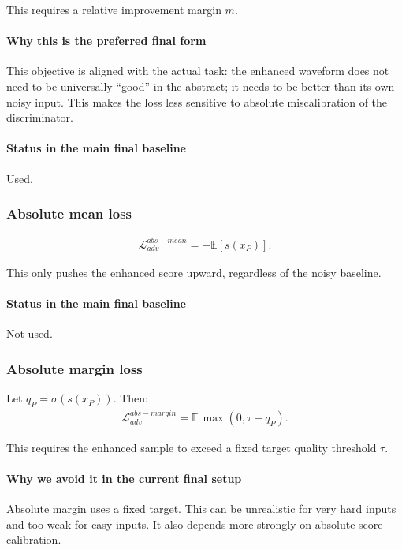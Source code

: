 \documentclass[11pt]{article}
\begin{document}
This requires a relative improvement margin $m$.

\paragraph{Why this is the preferred final form}
This objective is aligned with the actual task: the enhanced waveform does not need to be universally ``good'' in the abstract; it needs to be better than its own noisy input. This makes the loss less sensitive to absolute miscalibration of the discriminator.

\paragraph{Status in the main final baseline}
Used.

\subsubsection{Absolute mean loss}
\begin{align}
    \mathcal{L}_{adv}^{abs-mean} = -\mathbb{E}[s(x_P)].
\end{align}

This only pushes the enhanced score upward, regardless of the noisy baseline.

\paragraph{Status in the main final baseline}
Not used.

\subsubsection{Absolute margin loss}
Let $q_P = \sigma(s(x_P))$. Then:
\begin{align}
    \mathcal{L}_{adv}^{abs-margin} = \mathbb{E}\,\max(0, \tau - q_P).
\end{align}

This requires the enhanced sample to exceed a fixed target quality threshold $\tau$.

\paragraph{Why we avoid it in the current final setup}
Absolute margin uses a fixed target. This can be unrealistic for very hard inputs and too weak for easy inputs. It also depends more strongly on absolute score calibration.
\end{document}
